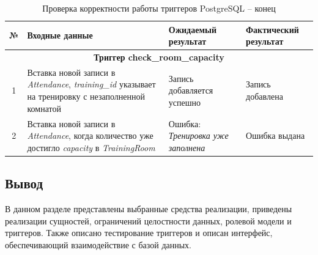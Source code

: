 \begin{table}[H]
	\centering
	\caption{Проверка корректности работы триггеров PostgreSQL -- конец}
	\label{tab:trigger-tests-start}
 	\begin{tabular}{|c|p{5.5cm}|p{5cm}|p{4cm}|}
		\hline
		\textbf{№} & \textbf{Входные данные} & \textbf{Ожидаемый \newline результат} & \textbf{Фактический результат} \\
		\hline
		
		\multicolumn{4}{|c|}{\textbf{Триггер check\_room\_capacity}} \\
		\hline
		
		1 & Вставка новой записи в \textit{Attendance}, \textit{training\_id} указывает на тренировку с незаполненной комнатой & Запись добавляется успешно & Запись добавлена \\
		\hline
		
		2 & Вставка новой записи в \textit{Attendance}, когда количество уже достигло \textit{capacity} в \textit{TrainingRoom} & Ошибка: \textit{Тренировка уже заполнена} & Ошибка выдана \\
		\hline
	\end{tabular}
\end{table}

\subsection*{Вывод}

В данном разделе представлены выбранные средства реализации, приведены реализации сущностей, ограничений целостности данных, ролевой модели и триггеров. Также описано тестирование триггеров и описан интерфейс, обеспечивающий взаимодействие с базой данных.